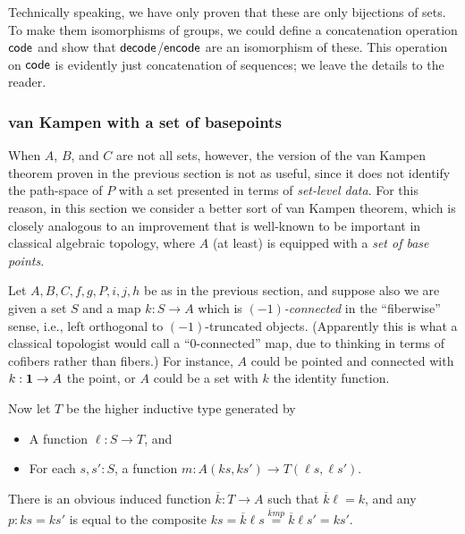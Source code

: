 Technically speaking, we have only proven that these are only bijections of sets.
To make them isomorphisms of groups, we could define a concatenation operation $\mathsf{code}$ and show that $\mathsf{decode}$/$\mathsf{encode}$ are an isomorphism of these.
This operation on $\mathsf{code}$ is evidently just concatenation of sequences; we leave the details to the reader.


\subsubsection{van Kampen with a set of basepoints}
\label{sec:better}

When $A$, $B$, and $C$ are not all sets, however, the version of the van Kampen theorem proven in the previous section is not as useful, since it does not identify the path-space of $P$ with a set presented in terms of \emph{set-level data}.
For this reason, in this section we consider a better sort of van Kampen theorem, which is closely analogous to an improvement that is well-known to be important in classical algebraic topology, where $A$ (at least) is equipped with a \emph{set of base points}.

Let $A,B,C,f,g,P,i,j,h$ be as in the previous section, and suppose also we are given a set $S$ and a map $k:S \to A$ which is \emph{$(-1)$-connected} in the ``fiberwise'' sense, i.e., left orthogonal to $(-1)$-truncated objects.
(Apparently this is what a classical topologist would call a ``$0$-connected'' map, due to thinking in terms of cofibers rather than fibers.)
For instance, $A$ could be pointed and connected with $k:\mathbf{1}\to A$ the point, or $A$ could be a set with $k$ the identity function.

Now let $T$ be the higher inductive type generated by
\begin{itemize}
\item A function $\ell:S\to T$, and
\item For each $s,s':S$, a function $m:A(ks,ks') \to T(\ell s, \ell s')$.
\end{itemize}
\newcommand{\kbar}{\overline{k}}
There is an obvious induced function $\kbar:T\to A$ such that $\kbar \ell = k$, and any $p:ks=ks'$ is equal to the composite $ks = \kbar \ell s \overset{\kbar m p}{=} \kbar \ell s' = k s'$.

